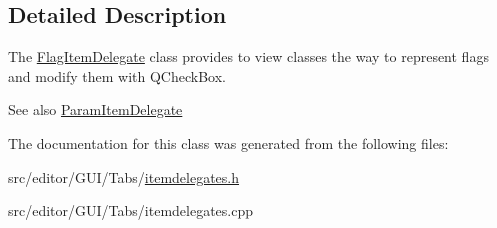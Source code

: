 \subsection{\-Detailed \-Description}
\-The \hyperlink{class_flag_item_delegate}{\-Flag\-Item\-Delegate} class provides to view classes the way to represent flags and modify them with \-Q\-Check\-Box. 

\begin{DoxySeeAlso}{\-See also}
\hyperlink{class_param_item_delegate}{\-Param\-Item\-Delegate} 
\end{DoxySeeAlso}


\-The documentation for this class was generated from the following files\-:\begin{DoxyCompactItemize}
\item 
src/editor/\-G\-U\-I/\-Tabs/\hyperlink{itemdelegates_8h}{itemdelegates.\-h}\item 
src/editor/\-G\-U\-I/\-Tabs/itemdelegates.\-cpp\end{DoxyCompactItemize}
